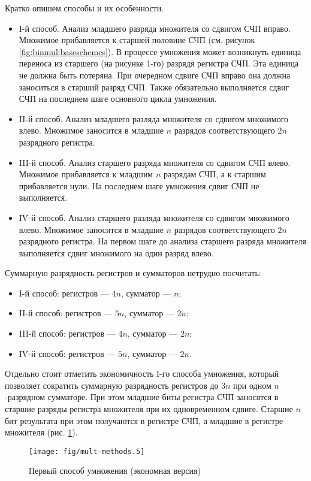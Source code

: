 Кратко опишем способы и их особенности.
\begin{itemize}
    \item I-й способ. Анализ младшего разряда множителя со сдвигом СЧП вправо. Множимое прибавляется к старшей половине СЧП (см. рисунок \ref{fig:binmul:baseschemes}). В процессе умножения может возникнуть единица переноса из старшего (на рисунке 1-го) разрядя регистра СЧП. Эта единица не должна быть потеряна. При очередном сдвиге СЧП вправо она должна заноситься в старший разряд СЧП. Также обязательно выполняется сдвиг СЧП на последнем шаге основного цикла умножения.
        
    \item II-й способ. Анализ младшего разляда множителя со сдвигом множимого влево. Множимое заносится в младшие $n$ разрядов соответствующего $2n$ разрядного регистра. 
    
    \item III-й способ. Анализ старшего разряда множителя со сдвигом СЧП влево. Множимое прибавляется к младшим $n$ разрядам СЧП, а к старшим прибавляется нули. На последнем шаге умножения сдвиг СЧП не выполняется.
    
    \item IV-й способ. Анализ старшего разляда множителя со сдвигом множимого влево. Множимое заносится в младшие $n$ разрядов соответствующего $2n$ разрядного регистра. На первом шаге до анализа старшего разряда множителя выполняется сдвиг множимого на один разряд влево.
\end{itemize}

Суммарную разрядность регистров и сумматоров нетрудно посчитать:
\begin{itemize}
    \item I-й способ: регистров --- $4n$, сумматор --- $n$;
    \item II-й способ: регистров --- $5n$, сумматор --- $2n$;
    \item III-й способ: регистров --- $4n$, сумматор --- $2n$;
    \item IV-й способ: регистров --- $5n$, сумматор --- $2n$.
\end{itemize}

Отдельно стоит отметить экономичность I-го способа умножения, который позволяет сократить суммарную разрядность регистров до $3n$ при одном $n$-разрядном сумматоре. При этом младшие биты регистра СЧП заносятся в старшие разряды регистра множителя при их одновременном сдвиге. Старшие $n$ бит результата при этом получаются в регистре СЧП, а младшие в регистре множителя (рис. \ref{fig:binmul:Ioptimized}).
\begin{figure}[!ht]
    \centering
    \texttt{[image: fig/mult-methods.5]}
    \caption{Первый способ умножения (экономная версия)}\label{fig:binmul:Ioptimized}
\end{figure}



